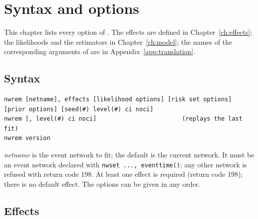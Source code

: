 \chapter{Syntax and options}\label{ch:options}

This chapter lists every option of \nwrem{}. The effects are defined in Chapter~\ref{ch:effects}; the likelihoods and the estimators in Chapter~\ref{ch:model}; the names of the corresponding arguments of \relevent{} are in Appendix~\ref{app:translation}.

\section{Syntax}

\begin{lstlisting}
nwrem [netname], effects [likelihood options] [risk set options] [prior options] [seed(#) level(#) ci noci]
nwrem [, level(#) ci noci]                        (replays the last fit)
nwrem version
\end{lstlisting}
\emph{netname} is the event network to fit; the default is the current network. It must be an event network declared with \texttt{nwset ..., eventtime()}; any other network is refused with return code 198. At least one effect is required (return code 198); there is no default effect. The options can be given in any order.

\section{Effects}

